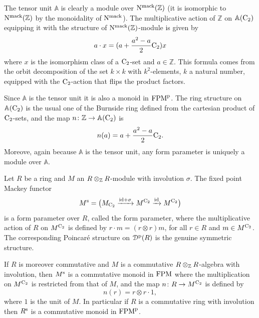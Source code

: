 \begin{example}
The tensor unit $\mathbb{A}$ is clearly a module over $\mathrm{N}^{\mathrm{mack}}(\mathbb{Z})$ (it is isomorphic to $\mathrm{N}^{\mathrm{mack}}(\mathbb{Z})$ by the monoidality of $\mathrm{N}^{\mathrm{mack}}$). The multiplicative action of $\mathbb{Z}$ on $\mathbb{A}(\mathrm{C_2})$ equipping it with the structure of $\mathrm{N}^{\mathrm{mack}}(\mathbb{Z})$-module is given by
\[
a\cdot x=(a+\frac{a^2-a}{2}\mathrm{C_2}) x
\]
where $x$ is the isomorphism class of a $\mathrm{C_2}$-set and $a\in\mathbb{Z}$. This formula comes from the orbit decomposition of the set $k\times k$ with $k^2$-elements, $k$ a natural number, equipped with the $\mathrm{C_2}$-action that flips the product factors.

Since $\mathbb{A}$ is the tensor unit it is also a monoid in $\mathrm {FPM}^{\mathrm p}$. The ring structure on $\mathbb{A}(\mathrm{C_2})$ is the usual one of the Burnside ring defined from the cartesian product of $\mathrm{C_2}$-sets, and the map $n\colon \mathbb{Z}\to \mathbb{A}(\mathrm{C_2})$ is
\[
n(a)=a+\frac{a^2-a}{2}\mathrm{C_2}.
\]
Moreove, again because $\mathbb{A}$ is the tensor unit, any form parameter is uniquely a module over $\mathbb{A}$.
\end{example}


\begin{example}
\label{example:fixeptmonoid}%
Let $R$ be a ring and $M$ an $R\otimes_{\mathbb{Z}} R$-module with involution $\sigma$. The fixed point Mackey functor
\[
M^{\mathrm{s}}=\big(M_{\mathrm{C_2}}\xrightarrow{\mathrm{id}+\sigma}M^{\mathrm{C_2}}\xrightarrow{\mathrm{id}}M^{\mathrm{C_2}}\big)
\]
is a form parameter over $R$, called the  form parameter, where the multiplicative action of $R$ on $M^{\mathrm{C_2}}$ is defined by $r\cdot m=(r\otimes r) m$, for all $r\in R$ and $m\in M^{\mathrm{C_2}}$. The corresponding Poincaré structure on ${\mathcal D}^{\mathrm{p}}(R)$ is the genuine symmetric structure.

If $R$ is moreover commutative and $M$ is a commutative $R\otimes_{\mathbb{Z}} R$-algebra with involution, then $M^{\mathrm{s}}$ is a commutative monoid in $\mathrm {FPM}$ where the multiplication on $M^{\mathrm{C_2}}$ is restricted from that of $M$, and the map $n\colon R\to M^{\mathrm{C_2}}$ is defined by
\[
n(r)=r\otimes r\cdot 1,
\]
where $1$ is the unit of $M$. In particular if $R$ is a commutative ring with involution then $R^{\mathrm{s}}$ is a commutative monoid in $\mathrm {FPM}^{\mathrm p}$.
\end{example}



